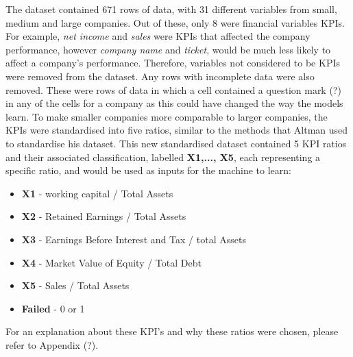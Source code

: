 \documentclass[11pt]{article}
\begin{document}
The dataset contained 671 rows of data, with 31 different variables from small, medium and large companies. Out of these, only 8 were financial variables KPIs. For example, \textit{net income} and \textit{sales} were KPIs that affected the company performance, however \textit{company name} and \textit{ticket}, would be much less likely to affect a company's performance. Therefore, variables not considered to be KPIs were removed from the dataset. Any rows with incomplete data were also removed. These were rows of data in which a cell contained a question mark (?) in any of the cells for a company as this could have changed the way the models learn. To make smaller companies more comparable to larger companies, the KPIs were standardised into five ratios, similar to the methods that Altman used to standardise his dataset. This new standardised dataset contained 5 KPI ratios and their associated classification, labelled \textbf{X1,..., X5}, each representing a specific ratio, and would be used as inputs for the machine to learn:
\begin{center}
	\begin{minipage}{.6\textwidth}
		\begin{itemize}
			\item[] \textbf{X1} - working capital / Total Assets
			\item[] \textbf{X2} - Retained Earnings / Total Assets
			\item[] \textbf{X3} - Earnings Before Interest and Tax / total Assets
			\item[] \textbf{X4} - Market Value of Equity / Total Debt
			\item[] \textbf{X5} - Sales / Total Assets
			\item[] \textbf{Failed} - 0 or 1
		\end{itemize}
	\end{minipage}
\end{center}
For an explanation about these KPI's and why these ratios were chosen, please refer to Appendix (?).
\end{document}
